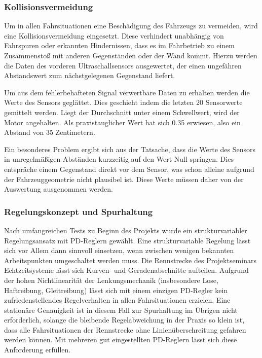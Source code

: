 \subsubsection{Kollisionsvermeidung}
\label{sec:kollision}

Um in allen Fahrsituationen eine Beschädigung des Fahrzeugs zu vermeiden, wird eine Kollisionsvermeidung eingesetzt. Diese verhindert unabhängig von Fahrspuren oder erkannten Hindernissen, dass es im Fahrbetrieb zu einem Zusammenstoß mit anderen Gegenständen oder der Wand kommt. Hierzu werden die Daten des vorderen Ultraschallsensors ausgewertet, der einen ungefähren Abstandswert zum nächstgelegenen Gegenstand liefert.

Um aus dem fehlerbehafteten Signal verwertbare Daten zu erhalten werden die Werte des Sensors geglättet. Dies geschieht indem die letzten 20 Sensorwerte gemittelt werden. Liegt der Durchschnitt unter einem Schwellwert, wird der Motor angehalten. Als praxistauglicher Wert hat sich 0.35 erwiesen, also ein Abstand von 35 Zentimetern.

Ein besonderes Problem ergibt sich aus der Tatsache, dass die Werte des Sensors in unregelmäßigen Abständen kurzzeitig auf den Wert Null springen. Dies entspräche einem Gegenstand direkt vor dem Sensor, was schon alleine aufgrund der Fahrzeuggeometrie nicht plausibel ist. Diese Werte müssen daher von der Auswertung ausgenommen werden.


\subsubsection{Regelungskonzept und Spurhaltung}
\label{sec:wallfollower}

Nach umfangreichen Tests zu Beginn des Projekts wurde ein strukturvariabler Regelungsansatz mit PD-Reglern gewählt. Eine strukturvariable Regelung lässt sich vor Allem dann sinnvoll einsetzen, wenn zwischen wenigen bekannten Arbeitspunkten umgeschaltet werden muss. Die Rennstrecke des Projektseminars Echtzeitsysteme lässt sich Kurven- und Geradenabschnitte aufteilen. Aufgrund der hohen Nichtlinearität der Lenkungsmechanik (insbesondere Lose, Haftreibung, Gleitreibung) lässt sich mit einem einzigen PD-Regler kein zufriedenstellendes Regelverhalten in allen Fahrsituationen erzielen. Eine stationäre Genauigkeit ist in diesem Fall zur Spurhaltung im Übrigen nicht erforderlich, solange die bleibende Regelabweichung in der Praxis so klein ist, dass alle Fahrsituationen der Rennstrecke ohne Linienüberschreitung gefahren werden können. Mit mehreren gut eingestellten PD-Reglern lässt sich diese Anforderung erfüllen.

